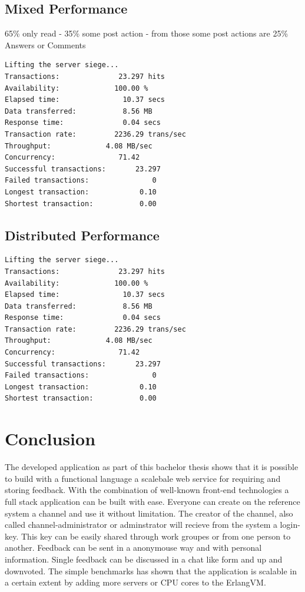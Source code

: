 \section{Mixed Performance}
65\% only read - 35\% some post action - from those some post actions are 25\% Answers or Comments
\begin{lstlisting}
Lifting the server siege...
Transactions:		       23.297 hits
Availability:		      100.00 %
Elapsed time:		        10.37 secs
Data transferred:	        8.56 MB
Response time:		        0.04 secs
Transaction rate:	      2236.29 trans/sec
Throughput:		        4.08 MB/sec
Concurrency:		       71.42
Successful transactions:       23.297
Failed transactions:	           0
Longest transaction:	        0.10
Shortest transaction:	        0.00
\end{lstlisting}
\section{Distributed Performance}
\begin{lstlisting}
Lifting the server siege...
Transactions:		       23.297 hits
Availability:		      100.00 %
Elapsed time:		        10.37 secs
Data transferred:	        8.56 MB
Response time:		        0.04 secs
Transaction rate:	      2236.29 trans/sec
Throughput:		        4.08 MB/sec
Concurrency:		       71.42
Successful transactions:       23.297
Failed transactions:	           0
Longest transaction:	        0.10
Shortest transaction:	        0.00
\end{lstlisting}


\chapter{Conclusion}
The developed application as part of this bachelor thesis shows that it is possible to build with a functional language a scalebale web service for requiring and storing feedback. With the combination of well-known front-end technologies a full stack application can be built with ease. 
Everyone can create on the reference system a channel and use it without limitation. The creator of the channel, also called channel-administrator or adminstrator will recieve from the system a login-key. This key can be easily shared through work groupes or from one person to another. Feedback can be sent in a anonymouse way and with personal information. Single feedback can be discussed in a chat like form and up and downvoted. 
The simple benchmarks has shown that the application is scalable in a certain extent by adding more servers or CPU cores to the ErlangVM.


